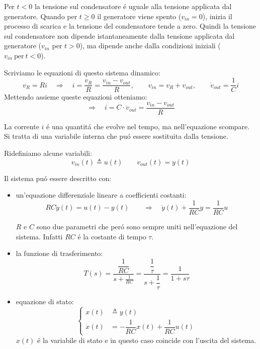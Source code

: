 \documentclass[../main.tex]{subfiles}
\begin{document}
		Per $ t<0 $ la tensione sul condensatore \'e uguale alla tensione applicata dal generatore. Quando per $ t\geq0 $ il generatore viene spento ($ v_{in}=0 $), inizia il processo di scarica e la tensione del condensatore tende a zero. Quindi la tensione sul condensatore non dipende istantaneamente dalla tensione applicata dal generatore ($ v_{in} $ per $ t>0 $), ma dipende anche dalla condizioni iniziali ($ v_{in}\ \mbox{per}\ t<0$).
		
		Scriviamo le equazioni di questo sistema dinamico:
		\[
			v_R = Ri \quad\Rightarrow\quad i = \dfrac{v_R}{R} = \dfrac{v_{in}-v_{out}}{R} , \quad  \quad
			 v_{in} = v_R + v_{out} , \quad  \quad
			\dot v_{out} = \frac{1}{C}i 
		\]
		Mettendo assieme queste equazioni otteniamo:
		\[ \Rightarrow\quad i = C \cdot \dot v_{out} = \dfrac{v_{in}-v_{out}}{R} \]
		
		La corrente $ i $ \'e una quantit\'a che evolve nel tempo, ma nell'equazione scompare. Si tratta di una variabile interna che pu\'o essere sostituita dalla tensione.
		
		Ridefiniamo alcune variabili:
		\[ v_{in}(t) \triangleq u(t) \qquad v_{out}(t) = y(t) \]
		
		Il sistema pu\'o essere descritto con:
		\begin{itemize}
			\item
				un'equazione differenziale lineare a coefficienti costanti:
				\[
					RC \dot y(t) = u(t) - y(t) \quad \quad
					\Rightarrow\quad  \dot y(t) + \dfrac{1}{RC} y = \dfrac{1}{RC} u
				\]
				
				$ R $ e $ C $ sono due parametri che per\'o sono sempre uniti nell'equazione del sistema. Infatti $ RC $ \'e la costante di tempo $ \tau $.
			\item
				la funzione di trasferimento:
				\[ T(s) = \dfrac{\dfrac{1}{RC}}{s+\frac{1}{RC}} = \dfrac{\dfrac{1}{\tau}}{s+\dfrac{1}{\tau}} = \dfrac{1}{1+s\tau} \] 
			\item
				equazione di stato:
				\[
					\begin{cases}
						x(t) &\triangleq y(t)\\
						\dot x(t) &= -\dfrac{1}{RC} x(t) + \dfrac{1}{RC} u(t)
					\end{cases}
				\]
				$ x(t) $ \'e la variabile di stato e in questo caso coincide con l'uscita del sistema.
		\end{itemize}
		
\end{document}
